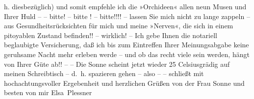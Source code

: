                h. diesbezüglich) und somit empfehle ich die »Orchideen« allen neun Musen und Ihrer Huld – – bitte! – bitte ! – bitte!!!!
               – lassen Sie mich nicht zu lange zappeln – aus Gesundheitsrücksichten für mich und
               meine »Nerven«, die sich in einem pitoyablen Zustand befinden!! – wirklich! – Ich
               gebe Ihnen die notariell beglaubigte Versicherung, daß ich bis zum Eintreffen Ihrer
               Meinungsabgabe keine geruhsame Nacht mehr erleben werde – und ob das recht viele sein
               werden, hängt von Ihrer Güte ab!! – – Die Sonne scheint jetzt wieder 25 Celsiusgrädig
               auf meinen Schreibtisch – d. h. spazieren gehen – also – – schließt mit
               hochachtungsvoller Ergebenheit und herzlichen Grüßen von der Frau Sonne und besten
               von mir\pend
           \pstart \spacefill\mbox{Elsa Plessner}\pend{}\endnumbering{}
\begin{anhang}
\end{anhang}
      